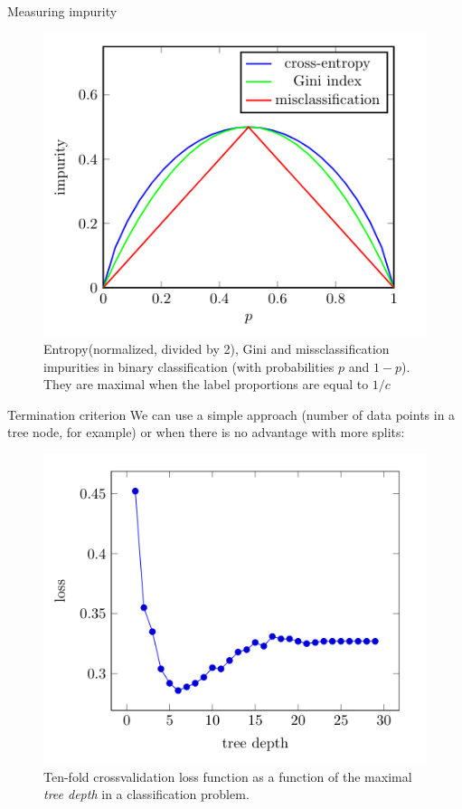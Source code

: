 \documentclass{beamer}
\begin{document}
\begin{frame}{Measuring impurity}
    \begin{figure}
        \includegraphics[width=0.7\linewidth]{F83Kroese}
        \caption{Entropy(normalized, divided by 2), Gini and missclassification impurities in binary classification (with probabilities $p$ and $1-p$). They are maximal when the label proportions are equal to $1/c$\cite{kroese2020}}
    \end{figure}
\end{frame}

\begin{frame}{Termination criterion}
    We can use a simple approach (number of data points in a tree node, for example) or when there is no advantage with more splits:
    \begin{figure}
        \includegraphics[width=0.7\linewidth]{F84Kroese}
        \caption{Ten-fold crossvalidation loss function as a function of the maximal {\em tree depth} in a classification problem.\cite{kroese2020}}
    \end{figure}
\end{frame}
\end{document}
